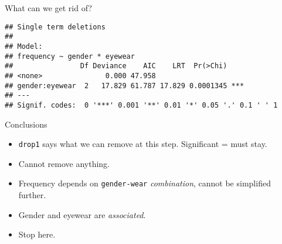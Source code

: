 \begin{frame}[fragile]{What can we get rid of?}

{\small    
 
\begin{knitrout}
\color{fgcolor}\begin{kframe}
\begin{alltt}
\hlstd{=}\hlstd{)}
\end{alltt}
\begin{verbatim}
## Single term deletions
## 
## Model:
## frequency ~ gender * eyewear
##                Df Deviance    AIC    LRT  Pr(>Chi)    
## <none>               0.000 47.958                     
## gender:eyewear  2   17.829 61.787 17.829 0.0001345 ***
## ---
## Signif. codes:  0 '***' 0.001 '**' 0.01 '*' 0.05 '.' 0.1 ' ' 1
\end{verbatim}
\end{kframe}
\end{knitrout}
}

  
\end{frame}

\begin{frame}[fragile]{Conclusions}

  \begin{itemize}
  \item \texttt{drop1} says what we can remove at this
    step. Significant = must stay.
  \item Cannot remove anything.
  \item Frequency depends on \texttt{gender-wear}
    \emph{combination}, cannot be simplified further.
  \item Gender and eyewear are \emph{associated}.
  \item Stop here.
  \end{itemize}
  
\end{frame}



